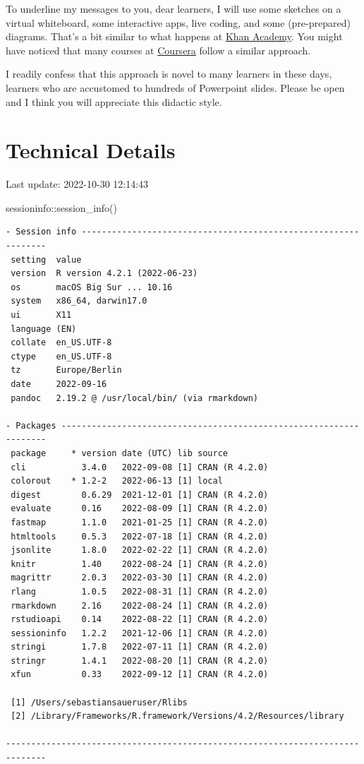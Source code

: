 \documentclass[
  letterpaper,
  DIV=11,
  numbers=noendperiod]{scrreprt}
\newenvironment{Shaded}{\begin{snugshade}}{\end{snugshade}}
\newcommand{\FunctionTok}[1]{\textcolor[rgb]{0.28,0.35,0.67}{#1}}
\newcommand{\NormalTok}[1]{\textcolor[rgb]{0.00,0.23,0.31}{#1}}
\newcommand{\SpecialCharTok}[1]{\textcolor[rgb]{0.37,0.37,0.37}{#1}}
\theoremstyle{definition}
\theoremstyle{definition}
\theoremstyle{remark}
\begin{document}
To underline my messages to you, dear learners, I will use some sketches
on a virtual whiteboard, some interactive apps, live coding, and some
(pre-prepared) diagrams. That's a bit similar to what happens at
\href{https://de.khanacademy.org/}{Khan Academy}. You might have noticed
that many courses at \href{https://www.coursera.org/}{Coursera} follow a
similar approach.

I readily confess that this approach is novel to many learners in these
days, learners who are accustomed to hundreds of Powerpoint slides.
Please be open and I think you will appreciate this didactic style.

\hypertarget{technical-details}{%
\section*{Technical Details}\label{technical-details}}

Last update: 2022-10-30 12:14:43

\begin{Shaded}
\begin{Highlighting}[]
\NormalTok{sessioninfo}\SpecialCharTok{::}\FunctionTok{session\_info}\NormalTok{()}
\end{Highlighting}
\end{Shaded}

\begin{verbatim}
- Session info ---------------------------------------------------------------
 setting  value
 version  R version 4.2.1 (2022-06-23)
 os       macOS Big Sur ... 10.16
 system   x86_64, darwin17.0
 ui       X11
 language (EN)
 collate  en_US.UTF-8
 ctype    en_US.UTF-8
 tz       Europe/Berlin
 date     2022-09-16
 pandoc   2.19.2 @ /usr/local/bin/ (via rmarkdown)

- Packages -------------------------------------------------------------------
 package     * version date (UTC) lib source
 cli           3.4.0   2022-09-08 [1] CRAN (R 4.2.0)
 colorout    * 1.2-2   2022-06-13 [1] local
 digest        0.6.29  2021-12-01 [1] CRAN (R 4.2.0)
 evaluate      0.16    2022-08-09 [1] CRAN (R 4.2.0)
 fastmap       1.1.0   2021-01-25 [1] CRAN (R 4.2.0)
 htmltools     0.5.3   2022-07-18 [1] CRAN (R 4.2.0)
 jsonlite      1.8.0   2022-02-22 [1] CRAN (R 4.2.0)
 knitr         1.40    2022-08-24 [1] CRAN (R 4.2.0)
 magrittr      2.0.3   2022-03-30 [1] CRAN (R 4.2.0)
 rlang         1.0.5   2022-08-31 [1] CRAN (R 4.2.0)
 rmarkdown     2.16    2022-08-24 [1] CRAN (R 4.2.0)
 rstudioapi    0.14    2022-08-22 [1] CRAN (R 4.2.0)
 sessioninfo   1.2.2   2021-12-06 [1] CRAN (R 4.2.0)
 stringi       1.7.8   2022-07-11 [1] CRAN (R 4.2.0)
 stringr       1.4.1   2022-08-20 [1] CRAN (R 4.2.0)
 xfun          0.33    2022-09-12 [1] CRAN (R 4.2.0)

 [1] /Users/sebastiansaueruser/Rlibs
 [2] /Library/Frameworks/R.framework/Versions/4.2/Resources/library

------------------------------------------------------------------------------
\end{verbatim}
\end{document}
